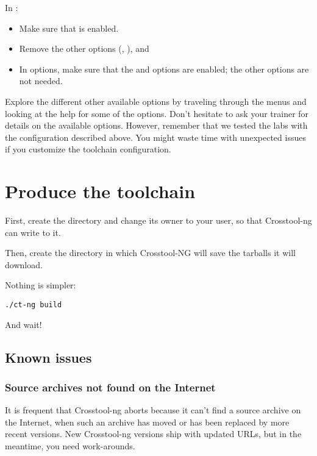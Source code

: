 In :
\begin{itemize}
\item Make sure that  is enabled.
\item Remove the other options (, ),
       and 
\item In  options, make sure that the  and
       options are enabled; the other
      options are not needed.
\end{itemize}

Explore the different other available options by traveling through the
menus and looking at the help for some of the options. Don't hesitate
to ask your trainer for details on the available options. However,
remember that we tested the labs with the configuration described
above. You might waste time with unexpected issues if you customize the
toolchain configuration.

\section{Produce the toolchain}

First, create the directory  and change its
owner to your user, so that Crosstool-ng can write to it.

Then, create the directory  in which Crosstool-NG
will save the tarballs it will download.

Nothing is simpler:

\begin{verbatim}
./ct-ng build
\end{verbatim}

And wait!

\subsection{Known issues}

\subsubsection{Source archives not found on the Internet}

It is frequent that Crosstool-ng aborts because it can't find a
source archive on the Internet, when such an archive has moved or has
been replaced by more recent versions. New Crosstool-ng versions ship
with updated URLs, but in the meantime, you need work-arounds.

